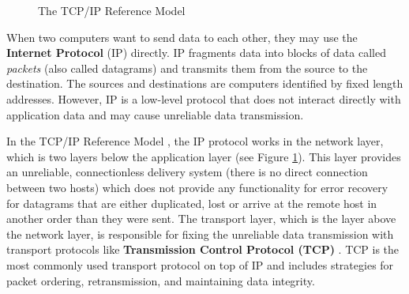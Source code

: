 
\begin{figure}[H]
    \centering
    
    \caption{The TCP/IP Reference Model \cite{tcpip}}
    \label{fig:tcpip}
    \hrulefill
\end{figure}

When two computers want to send data to each other, they may use the \textbf{Internet Protocol} (IP) \cite{rfc791} directly. IP fragments data into blocks of data called \textit{packets} (also called datagrams) and transmits them from the source to the destination. The sources and destinations are computers identified by fixed length addresses. However, IP is a low-level protocol that does not interact directly with application data and may cause unreliable data transmission.

In the TCP/IP Reference Model \cite{tcpip}, the IP protocol works in the network layer, which is two layers below the application layer (see Figure \ref{fig:tcpip}). This layer provides an unreliable, connectionless delivery system (there is no direct connection between two hosts) which does not provide any functionality for error recovery for datagrams that are either duplicated, lost or arrive at the remote host in another order than they were sent. The transport layer, which is the layer above the network layer, is responsible for fixing the unreliable data transmission with transport protocols like \textbf{Transmission Control Protocol (TCP)} \cite{rfc793}. TCP is the most commonly used transport protocol on top of IP and includes strategies for packet ordering, retransmission, and maintaining data integrity.

